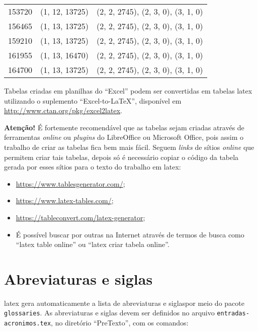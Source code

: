 \begin{longtable}{@{\extracolsep{\fill}}lll}
153720 & (1, 12, 13725) & (2, 2, 2745), (2, 3, 0), (3, 1, 0)                  \\
156465 & (1, 13, 13725) & (2, 2, 2745), (2, 3, 0), (3, 1, 0)                  \\
159210 & (1, 13, 13725) & (2, 2, 2745), (2, 3, 0), (3, 1, 0)                  \\
161955 & (1, 13, 16470) & (2, 2, 2745), (2, 3, 0), (3, 1, 0)                  \\
164700 & (1, 13, 13725) & (2, 2, 2745), (2, 3, 0), (3, 1, 0)                  \\
\end{longtable}

Tabelas criadas em planilhas do ``Excel'' podem ser convertidas em tabelas \gls{latex} utilizando o suplemento ``Excel-to-LaTeX'', disponível em \url{http://www.ctan.org/pkg/excel2latex}.

\textbf{Atenção!} É fortemente recomendável que as tabelas sejam criadas através de ferramentas \textit{online} ou \textit{plugins} do LibreOffice ou Microsoft Office, pois assim o trabalho de criar as tabelas fica bem mais fácil. Seguem \textit{links} de sítios \textit{online} que permitem criar tais tabelas, depois só é necessário copiar o código da tabela gerada por esses sítios para o texto do trabalho em \gls{latex}:
\begin{itemize}
    \item \url{https://www.tablesgenerator.com/};
    \item \url{https://www.latex-tables.com/};
    \item \url{https://tableconvert.com/latex-generator};
    \item É possível buscar por outras na Internet através de termos de busca como ``latex table online'' ou ``latex criar tabela online''.
\end{itemize}

\section{Abreviaturas e siglas}\label{sec:acronimos}

\gls{latex} gera automaticamente a lista de abreviaturas e siglaspor meio do pacote \texttt{glossaries}. As abreviaturas e siglas devem ser definidos no arquivo \texttt{entradas-acronimos.tex}, no diretório ``PreTexto'', com os comandos:

